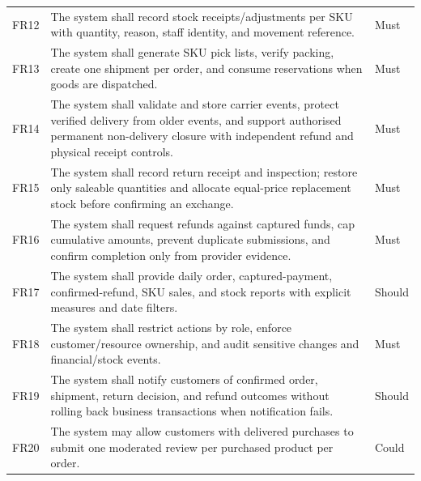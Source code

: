 \begin{longtable}{P{.1\linewidth}P{.68\linewidth}P{.12\linewidth}}
FR12 & The system shall record stock receipts/adjustments per SKU with quantity, reason, staff identity, and movement reference. & Must\\
FR13 & The system shall generate SKU pick lists, verify packing, create one shipment per order, and consume reservations when goods are dispatched. & Must\\
FR14 & The system shall validate and store carrier events, protect verified delivery from older events, and support authorised permanent non-delivery closure with independent refund and physical receipt controls. & Must\\
FR15 & The system shall record return receipt and inspection; restore only saleable quantities and allocate equal-price replacement stock before confirming an exchange. & Must\\
FR16 & The system shall request refunds against captured funds, cap cumulative amounts, prevent duplicate submissions, and confirm completion only from provider evidence. & Must\\
FR17 & The system shall provide daily order, captured-payment, confirmed-refund, SKU sales, and stock reports with explicit measures and date filters. & Should\\
FR18 & The system shall restrict actions by role, enforce customer/resource ownership, and audit sensitive changes and financial/stock events. & Must\\
FR19 & The system shall notify customers of confirmed order, shipment, return decision, and refund outcomes without rolling back business transactions when notification fails. & Should\\
FR20 & The system may allow customers with delivered purchases to submit one moderated review per purchased product per order. & Could\\
\bottomrule
\end{longtable}

